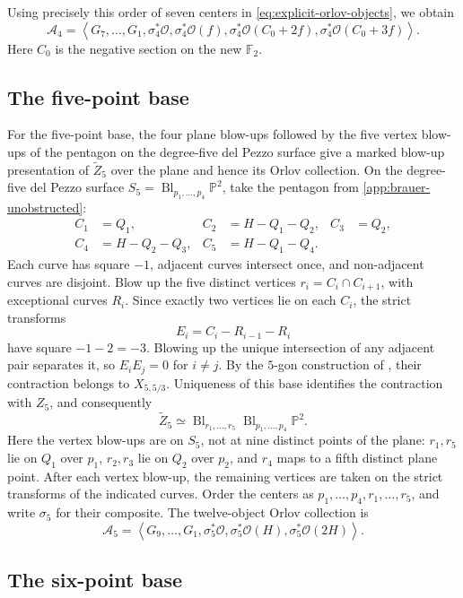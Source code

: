 \documentclass[11pt]{article}
\theoremstyle{plain}
\theoremstyle{definition}
\theoremstyle{remark}
\newcommand{\Pp}{\mathbb P}
\newcommand{\F}{\mathbb F}
\newcommand{\Bl}{\operatorname{Bl}}
\newcommand{\OO}{\mathcal O}
\begin{document}
Using precisely this order of seven centers in
\eqref{eq:explicit-orlov-objects}, we obtain
\[
\mathscr A_4=\left\langle G_7,\ldots,G_1,
\sigma_4^*\OO,\sigma_4^*\OO(f),
\sigma_4^*\OO(C_0+2f),\sigma_4^*\OO(C_0+3f)\right\rangle.
\]
Here \(C_0\) is the negative section on the new \(\F_2\).

\subsection{The five-point base}
\label{app:explicit-base-five}

For the five-point base, the four plane blow-ups followed by the five
vertex blow-ups of the pentagon on the degree-five del Pezzo surface give
a marked blow-up presentation of \(\widetilde Z_5\) over the plane and
hence its Orlov collection.
On the degree-five del Pezzo surface
\(S_5=\Bl_{p_1,\ldots,p_4}\Pp^2\), take the pentagon from
\cref{app:brauer-unobstructed}:
\[
\begin{aligned}
C_1&=Q_1,& C_2&=H-Q_1-Q_2,& C_3&=Q_2,\\
C_4&=H-Q_2-Q_3,& C_5&=H-Q_1-Q_4.
\end{aligned}
\]
Each curve has square \(-1\), adjacent curves intersect once, and
non-adjacent curves are disjoint. Blow up the five distinct vertices
\(r_i=C_i\cap C_{i+1}\), with exceptional curves \(R_i\).
Since exactly two vertices lie on each \(C_i\), the strict transforms
\[
E_i=C_i-R_{i-1}-R_i
\]
have square \(-1-2=-3\). Blowing up the unique intersection of any
adjacent pair separates it, so \(E_iE_j=0\) for \(i\ne j\).
By the \(5\)-gon construction of \cite[Section~3.5]{Corti2016},
their contraction belongs to \(X_{5,5/3}\). Uniqueness of this base
identifies the contraction with \(Z_5\), and consequently
\[
\widetilde Z_5\simeq
\Bl_{r_1,\ldots,r_5}\Bl_{p_1,\ldots,p_4}\Pp^2.
\]
Here the vertex blow-ups are on \(S_5\), not at nine distinct points
of the plane: \(r_1,r_5\) lie on \(Q_1\) over \(p_1\),
\(r_2,r_3\) lie on \(Q_2\) over \(p_2\), and \(r_4\) maps to a
fifth distinct plane point. After each vertex blow-up, the remaining
vertices are taken on the strict transforms of the indicated curves.
Order the centers as
\(p_1,\ldots,p_4,r_1,\ldots,r_5\), and write \(\sigma_5\)
for their composite. The twelve-object Orlov collection is
\[
\mathscr A_5=\left\langle G_9,\ldots,G_1,
\sigma_5^*\OO,\sigma_5^*\OO(H),\sigma_5^*\OO(2H)\right\rangle.
\]

\subsection{The six-point base}
\label{app:explicit-base-six}
\end{document}
